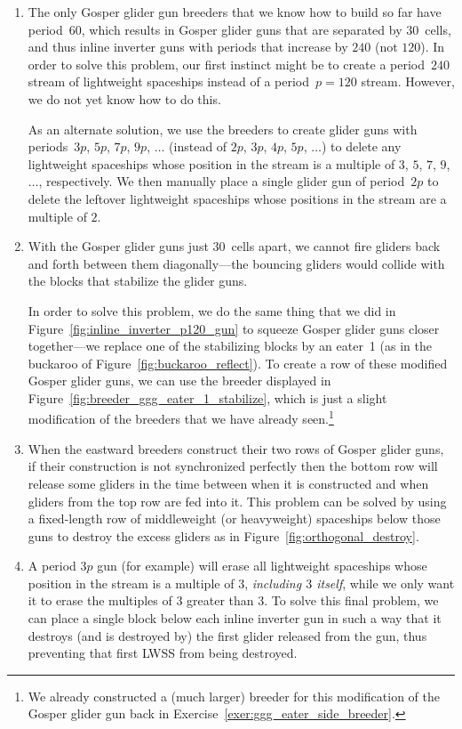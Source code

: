 \begin{enumerate}
	\item[1)] The only Gosper glider gun breeders that we know how to build so far have period~$60$, which results in Gosper glider guns that are separated by $30$~cells, and thus inline inverter guns with periods that increase by $240$ (not $120$). In order to solve this problem, our first instinct might be to create a period~$240$ stream of lightweight spaceships instead of a period~$p = 120$ stream. However, we do not yet know how to do this.
	
	As an alternate solution, we use the breeders to create glider guns with periods~$3p$, $5p$, $7p$, $9p$, $\ldots$ (instead of $2p$, $3p$, $4p$, $5p$, $\ldots$) to delete any lightweight spaceships whose position in the stream is a multiple of $3$, $5$, $7$, $9$, $\ldots$, respectively. We then manually place a single glider gun of period~$2p$ to delete the leftover lightweight spaceships whose positions in the stream are a multiple of $2$.\smallskip
	
	\item[2)] With the Gosper glider guns just $30$~cells apart, we cannot fire gliders back and forth between them diagonally---the bouncing gliders would collide with the blocks that stabilize the glider guns.
	
	In order to solve this problem, we do the same thing that we did in Figure~\ref{fig:inline_inverter_p120_gun} to squeeze Gosper glider guns closer together---we replace one of the stabilizing blocks by an eater~1 (as in the buckaroo of Figure~\ref{fig:buckaroo_reflect}). To create a row of these modified Gosper glider guns, we can use the breeder displayed in Figure~\ref{fig:breeder_ggg_eater_1_stabilize}, which is just a slight modification of the breeders that we have already seen.\footnote{We already constructed a (much larger) breeder for this modification of the Gosper glider gun back in Exercise~\ref{exer:ggg_eater_side_breeder}.}\smallskip
	
	\item[3)] When the eastward breeders construct their two rows of Gosper glider guns, if their construction is not synchronized perfectly then the bottom row will release some gliders in the time between when it is constructed and when gliders from the top row are fed into it. This problem can be solved by using a fixed-length row of middleweight (or heavyweight) spaceships below those guns to destroy the excess gliders as in Figure~\ref{fig:orthogonal_destroy}.\smallskip
	
	\item[4)] A period $3p$ gun (for example) will erase all lightweight spaceships whose position in the stream is a multiple of $3$, \emph{including $3$ itself}, while we only want it to erase the multiples of $3$ greater than $3$. To solve this final problem, we can place a single block below each inline inverter gun in such a way that it destroys (and is destroyed by) the first glider released from the gun, thus preventing that first LWSS from being destroyed.\smallskip
\end{enumerate}


